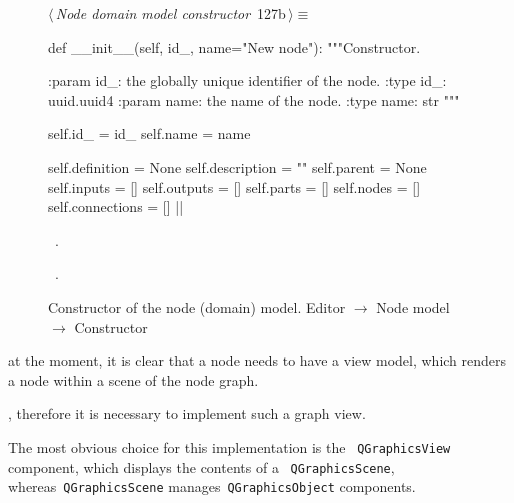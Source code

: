\documentclass[%
    a4paper,    %
    justified,  %
    nobib,      %
    openany     %
]{tufte-book}
\makeatletter
\renewcommand{\label}[1]{\@tufte@label{##1}}%
\makeatother
\begin{document}
\begin{figure}[!htbp]
\begin{flushleft} \small
\begin{minipage}{\linewidth}\label{scrap66}\raggedright\small
{} $\langle\,${\itshape Node domain model constructor}\nobreak\ {\footnotesize {127b}}$\,\rangle\equiv$
\vspace{-1ex}
\begin{pythoncode}
def __init__(self, id_, name="New node"):
    """Constructor.

    :param id_: the globally unique identifier of the node.
    :type  id_: uuid.uuid4
    :param name: the name of the node.
    :type  name: str
    """

    self.id_   = id_
    self.name = name

    self.definition = None
    self.description = ""
    self.parent = None
    self.inputs = []
    self.outputs = []
    self.parts = []
    self.nodes = []
    self.connections = []
|\NWsep|
\end{pythoncode}
\vspace{1.5ex}
\footnotesize
\begin{list}{}{\setlength{\itemsep}{-\parsep}\setlength{\itemindent}{-\leftmargin}}
\item \NWtxtMacroDefBy\ .
\item \NWtxtMacroRefIn\ .

\item{}
\end{list}
\end{minipage}\vspace{4ex}
\end{flushleft}
\caption{Constructor of the node (domain) model.
  \newline{}\newline{}Editor $\rightarrow$ Node model $\rightarrow$ Constructor}
\end{figure}

 at the moment, it is
clear that a node needs to have a view model, which renders a node within a
scene of the node graph.

, therefore it is
necessary to implement such a graph view.

The most obvious choice for this implementation is the ~\verb=QGraphicsView=
component, which displays the contents of a ~\verb=QGraphicsScene=,
whereas~\verb=QGraphicsScene= manages~\verb=QGraphicsObject= components.
\end{document}

